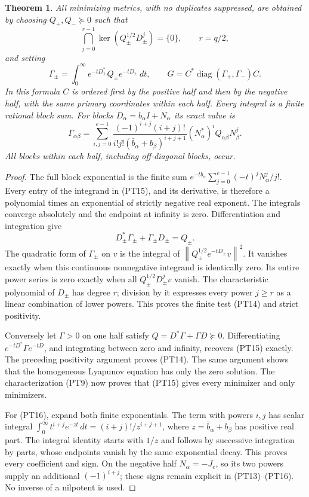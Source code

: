 \documentclass[11pt]{article}
\newcommand{\norm}[1]{\left\lVert#1\right\rVert}
\DeclareMathOperator{\diag}{diag}
\newtheorem{theorem}{Theorem}
\begin{document}
\begin{theorem}
All minimizing metrics, with no duplicates suppressed, are obtained
by choosing \(Q_+,Q_-\succeq0\) such that
\begin{equation}\tag{PT14}
 \bigcap_{j=0}^{r-1}\ker(Q_\pm^{1/2}D_\pm^j)=\{0\},
 \qquad r=q/2,
\end{equation}
and setting
\begin{equation}\tag{PT15}
 \Gamma_\pm=\int_0^\infty e^{-tD_\pm^*}Q_\pm e^{-tD_\pm}\,dt,
 \qquad G=C^*\diag(\Gamma_+,\Gamma_-)C.
\end{equation}
In this formula \(C\) is ordered first by the positive half and
then by the negative half, with the same primary coordinates
within each half. Every integral is a finite rational block sum.
For blocks \(D_\alpha=b_\alpha I+N_\alpha\) its exact value is
\begin{equation}\tag{PT16}
 \Gamma_{\alpha\beta}
 =\sum_{i,j=0}^{e-1}
 \frac{(-1)^{i+j}(i+j)!}
      {i!j!(\bar b_\alpha+b_\beta)^{i+j+1}}
 (N_\alpha^*)^i Q_{\alpha\beta}N_\beta^j.
\end{equation}
All blocks within each half, including off-diagonal blocks, occur.
\end{theorem}
\begin{proof}
The full block exponential is the finite sum
\(e^{-tb_\alpha}\sum_{j=0}^{e-1}(-t)^jN_\alpha^j/j!\).
Every entry of the integrand in (PT15), and its derivative, is
therefore a polynomial times an exponential of strictly negative
real exponent. The integrals converge absolutely and the endpoint
at infinity is zero. Differentiation and integration give
\[
 D_\pm^*\Gamma_\pm+\Gamma_\pm D_\pm=Q_\pm.
\]
The quadratic form of \(\Gamma_\pm\) on \(v\) is the integral
of \(\norm{Q_\pm^{1/2}e^{-tD_\pm}v}^2\). It vanishes
exactly when this continuous nonnegative integrand is identically
zero. Its entire power series is zero exactly when all
\(Q_\pm^{1/2}D_\pm^jv\) vanish. The characteristic polynomial
of \(D_\pm\) has degree \(r\); division by it expresses every
power \(j\ge r\) as a linear combination of lower powers.
This proves the finite test (PT14) and strict positivity.

Conversely let \(\Gamma>0\) on one half satisfy
\(Q=D^*\Gamma+\Gamma D\succeq0\). Differentiating
\(e^{-tD^*}\Gamma e^{-tD}\), and integrating between zero
and infinity, recovers (PT15) exactly. The preceding positivity
argument proves (PT14). The same argument shows that the
homogeneous Lyapunov equation has only the zero solution.
The characterization (PT9) now proves that (PT15) gives every
minimizer and only minimizers.

For (PT16), expand both finite exponentials. The term with powers
\(i,j\) has scalar integral
\(\int_0^\infty t^{i+j}e^{-zt}\,dt=(i+j)!/z^{i+j+1}\),
where \(z=\bar b_\alpha+b_\beta\) has positive real part.
The integral identity starts with \(1/z\) and follows by
successive integration by parts, whose endpoints vanish by the
same exponential decay. This proves every coefficient and sign.
On the negative half \(N_\alpha=-J_e\), so its two powers
supply an additional \((-1)^{i+j}\); these signs remain
explicit in (PT13)--(PT16). No inverse of a nilpotent is used.
\end{proof}
\end{document}
